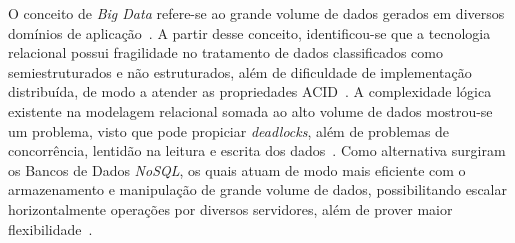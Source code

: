 \documentclass[12pt]{article}
\begin{document}
O conceito de \textit{Big Data} refere-se ao grande volume de dados gerados em diversos domínios de aplicação~\cite{han2011survey,index2013zettabyte}.
A partir desse conceito, identificou-se que a tecnologia relacional possui fragilidade no tratamento de dados classificados como semiestruturados e não estruturados, além de dificuldade de implementação distribuída, de modo a atender as propriedades ACID~\cite{aparicio:2016}. A complexidade lógica existente na modelagem relacional somada ao alto volume de dados mostrou-se um problema, visto que pode propiciar \textit{deadlocks}, além de problemas de concorrência, lentidão na leitura e escrita dos dados~\cite{han2011survey,brito2010bancos}.
Como alternativa surgiram os Bancos de Dados \textit{NoSQL}, os quais atuam de modo mais eficiente com o armazenamento e manipulação de grande volume de dados, possibilitando escalar horizontalmente operações por diversos servidores, além de prover maior flexibilidade~\cite{mohamed:2014,ramesh:2016}. 
\end{document}
